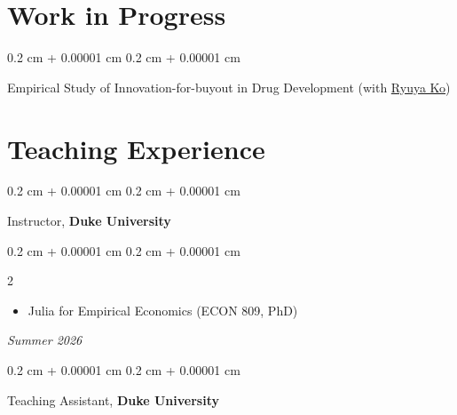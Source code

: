 \documentclass[11pt, letterpaper]{article}
\newenvironment{highlights}{
    \begin{itemize}[
        topsep=0.10 cm,
        parsep=0.10 cm,
        partopsep=0pt,
        itemsep=0pt,
        leftmargin=0.4 cm + 10pt
    ]
}{
    \end{itemize}
} %
\newenvironment{onecolentry}{
    \begin{adjustwidth}{
        0.2 cm + 0.00001 cm
    }{
        0.2 cm + 0.00001 cm
    }
}{
    \end{adjustwidth}
} %
\newenvironment{twocolentry}[2][]{
    \onecolentry
    \def\secondColumn{#2}
    \setcolumnwidth{\fill, 4.5 cm}
    \begin{paracol}{2}
}{
    \switchcolumn \raggedleft \secondColumn
    \end{paracol}
    \endonecolentry
} %
\let\hrefWithoutArrow\href
\renewcommand{\href}[2]{\hrefWithoutArrow{#1}{\ifthenelse{\equal{#2}{}}{ }{#2 }\raisebox{.15ex}{\footnotesize \faExternalLink*}}}
\begin{document}
    \section{Work in Progress}

    \begin{onecolentry}
        Empirical Study of Innovation-for-buyout in Drug Development (with \hrefWithoutArrow{https://ryuya-ko.github.io/}{Ryuya Ko})
    \end{onecolentry}
    \vspace{0.2cm}

    
    \section{Teaching Experience}
    \begin{onecolentry}
        Instructor, \textbf{Duke University}
    \end{onecolentry}
    \vspace{0.1cm}

    \begin{twocolentry}{
        \textit{Summer 2026}
   }
   \begin{highlights}
   \item Julia for Empirical Economics (ECON 809, PhD)
   \end{highlights}
\end{twocolentry}
\vspace{0.2cm}

    \begin{onecolentry}
        Teaching Assistant, \textbf{Duke University}
    \end{onecolentry}
    \vspace{0.1cm}
\end{document}

